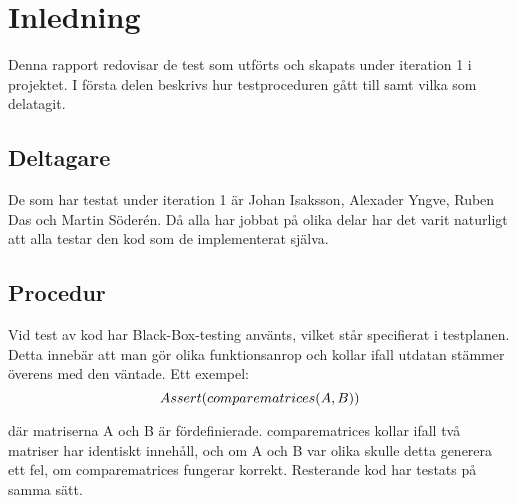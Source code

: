 \section{Inledning}
Denna rapport redovisar de test som utförts och skapats under iteration 1 i projektet. I första delen beskrivs hur testproceduren gått till samt vilka som delatagit.
\subsection{Deltagare}
De som har testat under iteration 1 är Johan Isaksson, Alexader Yngve, Ruben Das och Martin Söderén. Då alla har jobbat på olika delar har det varit naturligt att alla testar den kod som de implementerat själva. 

\subsection{Procedur}
Vid test av kod har Black-Box-testing använts, vilket står specifierat i testplanen. Detta innebär att man gör olika funktionsanrop och kollar ifall utdatan stämmer överens med den väntade. Ett exempel:
$$Assert(compare\underline{\space}matrices(A, B))$$

där matriserna A och B är fördefinierade. compare\underline{\space}matrices kollar ifall två matriser har identiskt innehåll, och om A och B var olika skulle detta generera ett fel, om compare\underline{\space}matrices fungerar korrekt.
\newline Resterande kod har testats på samma sätt.

